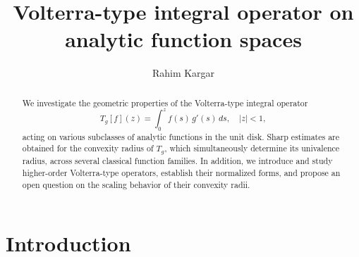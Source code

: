 \documentclass[12pt,a4paper]{amsart}
\title[Volterra-type integral operator]
{Volterra-type integral operator on analytic function spaces}
\numberwithin{equation}{section}
\theoremstyle{remark}
\newcounter{minutes}\setcounter{minutes}{\time}
\newcounter{hours}\setcounter{hours}{\time}
\begin{document}
\begin{abstract}
We investigate the geometric properties of the Volterra-type integral operator
\begin{equation*}
T_g[f](z) = \int_{0}^{z} f(s)\, g'(s)\, ds, \quad |z|<1,
\end{equation*}
acting on various subclasses of analytic functions in the unit disk.  
Sharp estimates are obtained for the convexity radius of $T_g$, which simultaneously determine its univalence radius, across several classical function families.  
In addition, we introduce and study higher-order Volterra-type operators, establish their normalized forms, and propose an open question on the scaling behavior of their convexity radii.  
\end{abstract}



\def\thefootnote{}
{}
\makeatletter\def\thefootnote{\@arabic\c@footnote}\makeatother

\author[R. Kargar] {Rahim Kargar}
\address{Department of Mathematics and Statistics, University of Turku,
         Turku, Finland}




\maketitle

\section{Introduction}
\end{document}
